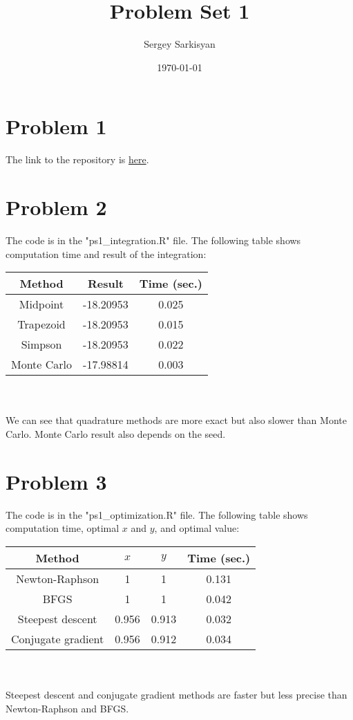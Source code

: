 \documentclass[11pt,a4paper]{article}
\title{Problem Set 1}
\author{Sergey Sarkisyan}
\date{\today}
\begin{document}
	\maketitle
	\section*{Problem 1}
	\noindent The link to the repository is \href{https://github.com/sarkisyan/econ714codes}{here}.
	
	\section*{Problem 2}
	\noindent The code is in the "ps1\_integration.R" file. The following table shows computation time and result of the integration:\\
	
	\begin{tabular}{|c|c|c|}
		\hline
		Method & Result & Time (sec.) \\
		\hline
		Midpoint & -18.20953 & 0.025 \\
		\hline
		Trapezoid & -18.20953 & 0.015 \\
		\hline
		Simpson & -18.20953 & 0.022 \\
		\hline
		Monte Carlo & -17.98814 & 0.003 \\
		\hline
	\end{tabular}
	\\ \\
	We can see that quadrature methods are more exact but also slower than Monte Carlo. Monte Carlo result also depends on the seed. 
	
	\section*{Problem 3}
	\noindent The code is in the "ps1\_optimization.R" file. The following table shows computation time, optimal $x$ and $y$, and optimal value:\\
	
	\begin{tabular}{|c|c|c|c|}
		\hline
		Method & $x$ & $y$ & Time (sec.)   \\
		\hline
		Newton-Raphson & 1 & 1 & 0.131 \\
		\hline
		BFGS & 1 & 1 & 0.042  \\
		\hline
		Steepest descent & 0.956 & 0.913 & 0.032  \\
		\hline
		Conjugate gradient & 0.956 & 0.912 & 0.034  \\
		\hline
	\end{tabular}
	\\ \\
	Steepest descent and conjugate gradient methods are faster but less precise than Newton-Raphson and BFGS. 
	
\end{document}
